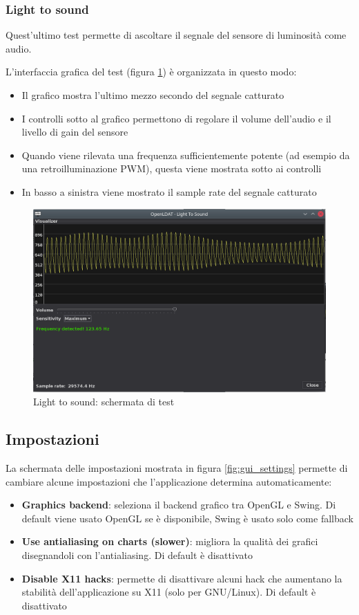 \subsubsection{Light to sound}
Quest'ultimo test permette di ascoltare il segnale del sensore di luminosità come audio.

L'interfaccia grafica del test (figura \ref{fig:gui_lighttosound_results}) è organizzata in questo modo:\begin{itemize}
	\item Il grafico mostra l'ultimo mezzo secondo del segnale catturato
	\item I controlli sotto al grafico permettono di regolare il volume dell'audio e il livello di gain del sensore
	\item Quando viene rilevata una frequenza sufficientemente potente (ad esempio da una retroilluminazione PWM), questa viene mostrata sotto ai controlli
	\item In basso a sinistra viene mostrato il sample rate del segnale catturato
\end{itemize}

\begin{figure}[H]
	\centering
	\includegraphics[width=\textwidth]{Applicazione_files/gui_lighttosound_results.png}
	\caption{Light to sound: schermata di test}
	\label{fig:gui_lighttosound_results}
\end{figure}

\subsection{Impostazioni}
La schermata delle impostazioni mostrata in figura \ref{fig:gui_settings} permette di cambiare alcune impostazioni che l'applicazione determina automaticamente:\begin{itemize}
	\item \textbf{Graphics backend}: seleziona il backend grafico tra OpenGL e Swing. Di default viene usato OpenGL se è disponibile, Swing è usato solo come fallback
	\item \textbf{Use antialiasing on charts (slower)}: migliora la qualità dei grafici disegnandoli con l'antialiasing. Di default è disattivato
	\item \textbf{Disable X11 hacks}: permette di disattivare alcuni hack che aumentano la stabilità dell'applicazione su X11 (solo per GNU/Linux). Di default è disattivato
\end{itemize}

